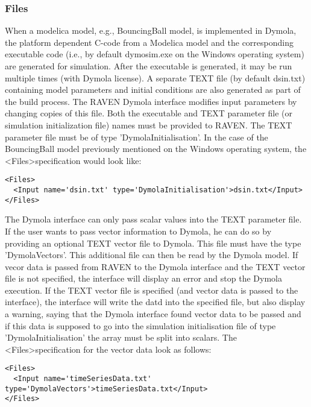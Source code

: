 \subsubsection{Files}
When a modelica model, e.g., BouncingBall model, is implemented in Dymola, the platform dependent C-code from a Modelica model and the corresponding executable code
(i.e., by default dymosim.exe on the Windows operating system) are generated for simulation.  After the executable is generated, it may be run multiple times (with Dymola license).
A separate TEXT file (by default dsin.txt) containing model parameters and initial conditions are also generated as part of the build process.  The RAVEN Dymola interface
modifies input parameters by changing copies of this file.  Both the executable and TEXT parameter file (or simulation initialization file) names must be provided to RAVEN. The TEXT parameter file must be of type 'DymolaInitialisation'.  In the case of
the BouncingBall model previously mentioned on the Windows operating system, the \textless Files\textgreater  specification would look like:
\begin{lstlisting}[style=XML]
<Files>
  <Input name='dsin.txt' type='DymolaInitialisation'>dsin.txt</Input>
</Files>
\end{lstlisting}

The Dymola interface can only pass scalar values into the TEXT parameter file. If the user wants to pass vector information to Dymola, he can do so by providing an optional TEXT vector file to Dymola. This file must have the type 'DymolaVectors'. This additional file can then be read by the Dymola model. If vecor data is passed from RAVEN to the Dymola interface and the TEXT vector file is not specified, the interface will display an error and stop the Dymola execution. If the TEXT vector file is specified (and vector data is passed to the interface), the interface will write the datd into the specified file, but also display a warning, saying that the Dymola interface found vector data to be passed and if this data is supposed to go into the simulation initialisation file of type 'DymolaInitialisation' the array must be split into scalars. The \textless Files\textgreater specification for the vector data look as follows:
\begin{lstlisting}[style=XML]
<Files>
  <Input name='timeSeriesData.txt' type='DymolaVectors'>timeSeriesData.txt</Input>
</Files>
\end{lstlisting}

